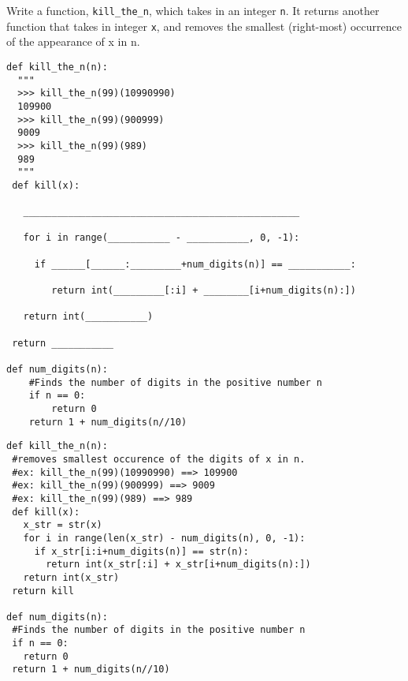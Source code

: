 \begin{blocksection}
\question Write a function, \texttt{kill\_the\_n}, which takes in an integer \texttt{n}. It returns another function that takes in integer \texttt{x}, and removes the smallest (right-most) occurrence of the appearance of x in n.

\begin{lstlisting}
def kill_the_n(n):
  """
  >>> kill_the_n(99)(10990990)
  109900
  >>> kill_the_n(99)(900999)
  9009
  >>> kill_the_n(99)(989)
  989
  """
 def kill(x):
 
   _________________________________________________
   
   for i in range(___________ - ___________, 0, -1):
   
     if ______[______:_________+num_digits(n)] == ___________:
     
        return int(_________[:i] + ________[i+num_digits(n):])
       
   return int(___________)
   
 return ___________

def num_digits(n):
    #Finds the number of digits in the positive number n
    if n == 0:
        return 0
    return 1 + num_digits(n//10)

\end{lstlisting}

\begin{solution}
\begin{lstlisting}
def kill_the_n(n):
 #removes smallest occurence of the digits of x in n.
 #ex: kill_the_n(99)(10990990) ==> 109900
 #ex: kill_the_n(99)(900999) ==> 9009
 #ex: kill_the_n(99)(989) ==> 989
 def kill(x):
   x_str = str(x)
   for i in range(len(x_str) - num_digits(n), 0, -1):
     if x_str[i:i+num_digits(n)] == str(n):
       return int(x_str[:i] + x_str[i+num_digits(n):])
   return int(x_str)
 return kill

def num_digits(n):
 #Finds the number of digits in the positive number n
 if n == 0:
   return 0
 return 1 + num_digits(n//10)



\end{lstlisting}
\end{solution}
\end{blocksection}


